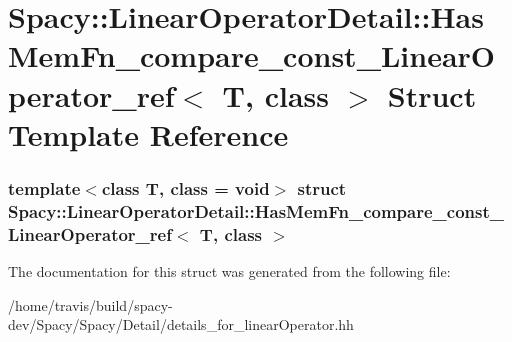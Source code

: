 \hypertarget{structSpacy_1_1LinearOperatorDetail_1_1HasMemFn__compare__const__LinearOperator__ref}{\section{\-Spacy\-:\-:\-Linear\-Operator\-Detail\-:\-:\-Has\-Mem\-Fn\-\_\-compare\-\_\-const\-\_\-\-Linear\-Operator\-\_\-ref$<$ \-T, class $>$ \-Struct \-Template \-Reference}
\label{structSpacy_1_1LinearOperatorDetail_1_1HasMemFn__compare__const__LinearOperator__ref}
}
\subsubsection*{template$<$class T, class = void$>$ struct Spacy\-::\-Linear\-Operator\-Detail\-::\-Has\-Mem\-Fn\-\_\-compare\-\_\-const\-\_\-\-Linear\-Operator\-\_\-ref$<$ T, class $>$}



\-The documentation for this struct was generated from the following file\-:\begin{DoxyCompactItemize}
\item 
/home/travis/build/spacy-\/dev/\-Spacy/\-Spacy/\-Detail/details\-\_\-for\-\_\-linear\-Operator.\-hh\end{DoxyCompactItemize}
